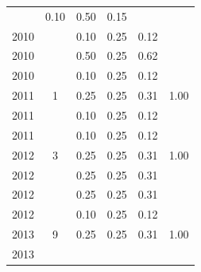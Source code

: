 \begin{table}[H]
\begin{tabular}{| l | c | c | c | c | c |}
          &
          0.10
          &
          0.50
          &
          0.15
          &
          \\
            2010
          &
          
          &
          0.10
          &
          0.25
          &
          0.12
          &
          \\
            2010
          &
          
          &
          0.50
          &
          0.25
          &
          0.62
          &
          \\
            2010
          &
          
          &
          0.10
          &
          0.25
          &
          0.12
          &
          \\
\hline
            2011
          &
          1
          &
          0.25
          &
          0.25
          &
          0.31
          &
            {\color{blue} 1.00}
          \\
            2011
          &
          
          &
          0.10
          &
          0.25
          &
          0.12
          &
          \\
            2011
          &
          
          &
          0.10
          &
          0.25
          &
          0.12
          &
          \\
\hline
            2012
          &
          3
          &
          0.25
          &
          0.25
          &
          0.31
          &
            {\color{blue} 1.00}
          \\
            2012
          &
          
          &
          0.25
          &
          0.25
          &
          0.31
          &
          \\
            2012
          &
          
          &
          0.25
          &
          0.25
          &
          0.31
          &
          \\
            2012
          &
          
          &
          0.10
          &
          0.25
          &
          0.12
          &
          \\
\hline
            2013
          &
          9
          &
          0.25
          &
          0.25
          &
          0.31
          &
            {\color{blue} 1.00}
          \\
            2013
          &
          

\end{tabular}
\end{table}
